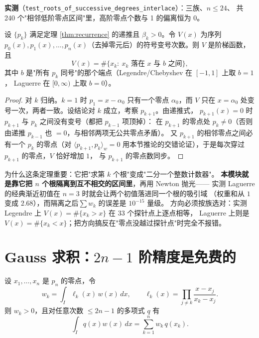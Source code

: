 \textbf{实测}（\texttt{test\_roots\_of\_successive\_degrees\_interlace}）：三族、$n\le24$、
共 240 个"相邻低阶零点区间"里，高阶零点个数与 1 的偏离恒为 $0$。

\begin{theorem}
\label{thm:sturm}
设 $\{p_k\}$ 满足定理 \ref{thm:recurrence} 的递推且 $\beta_k>0$。令 $V(x)$ 为序列
$p_0(x),p_1(x),\dots,p_n(x)$（去掉零元后）的符号变号次数。则 $V$ 是阶梯函数，且
\[
  V(x)=\#\{x_k:\ x_k \text{ 落在 } x \text{ 与 } b \text{ 之间}\},
\]
其中 $b$ 是"所有 $p_k$ 同号"的那个端点（Legendre/Chebyshev 在 $[-1,1]$ 上取 $b=1$，
Laguerre 在 $[0,\infty)$ 上取 $b=0$）。
\end{theorem}

\begin{proof}
对 $k$ 归纳。$k=1$ 时 $p_1=x-\alpha_0$ 只有一个零点 $\alpha_0$，而 $V$ 只在 $x=\alpha_0$
处变号一次，两者一致。设结论对 $k$ 成立，考察 $p_{k+1}$。由递推式，
$p_{k+1}(x)=0$ 时 $p_{k+1}$ 与 $p_k$ 之间没有变号（都把 $p_{k-1}$ 项顶掉）：
在 $p_{k+1}$ 的零点处 $p_k\ne0$（否则由递推 $p_{k-1}$ 也 $=0$，与相邻两项无公共零点矛盾）。
又 $p_{k+1}$ 的相邻零点之间必有一个 $p_k$ 的零点（对 $\langle p_{k+1},p_k\rangle_w=0$
用本节推论的交错论证），于是每次穿过 $p_{k+1}$ 的零点，$V$ 恰好增加 $1$，
与 $p_{k+1}$ 的零点数同步。
\end{proof}

为什么这条定理重要：它把"求第 $k$ 个根"变成"二分一个整数计数器"。
\textbf{本模块就是靠它把 $n$ 个根隔离到互不相交的区间里}，再用 Newton 抛光——
实测 Laguerre 的经典渐近初值在 $n=3$ 时就会让两个初值落进同一个根的吸引域
（权重和从 $1$ 变成 $2.68$），而隔离之后$\sum w_k$ 的误差是 $10^{-15}$ 量级。
方向必须按族选对：实测 Legendre 上 $V(x)=\#\{x_k>x\}$ 在 33 个探针点上逐点相等，
Laguerre 上则是 $V(x)=\#\{x_k<x\}$；把方向搞反在"零点没越过探针点"时完全不报错。

\section{Gauss 求积：$2n-1$ 阶精度是免费的}

\begin{theorem}[Gauss 求积]
\label{thm:gauss}
设 $x_1,\dots,x_n$ 是 $p_n$ 的零点，令
\[
  w_k=\int_I \ell_k(x)\,w(x)\,dx,\qquad
  \ell_k(x)=\prod_{j\ne k}\frac{x-x_j}{x_k-x_j}.
\]
则 $w_k>0$，且对任意次数 $\le 2n-1$ 的多项式 $q$ 有
\[
  \int_I q(x)w(x)\,dx=\sum_{k=1}^n w_k\,q(x_k).
\]
\end{theorem}

